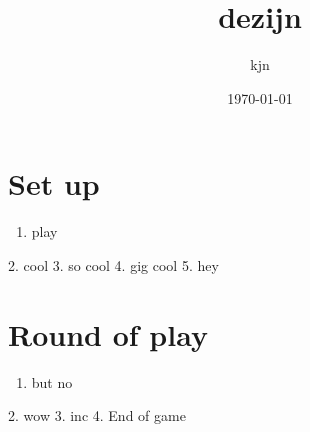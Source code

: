 \documentclass{article}%
\title{dezijn}%
\author{kjn}%
\date{\today}%
\begin{document}
%
\pagestyle{empty}%
\normalsize%
\maketitle%
\section{ Set up
}%
\label{sec:Setup}%
\begin{enumerate}%
\item%
 play
%
\end{enumerate}%
2. cool
%
3. so cool
%
4. gig cool
%
5. hey


%
\section{ Round of play
}%
\label{sec:Roundofplay}%
\begin{enumerate}%
\item%
 but no
%
\end{enumerate}%
2. wow
%
3. inc
%
4. End of game

%
\end{document}
